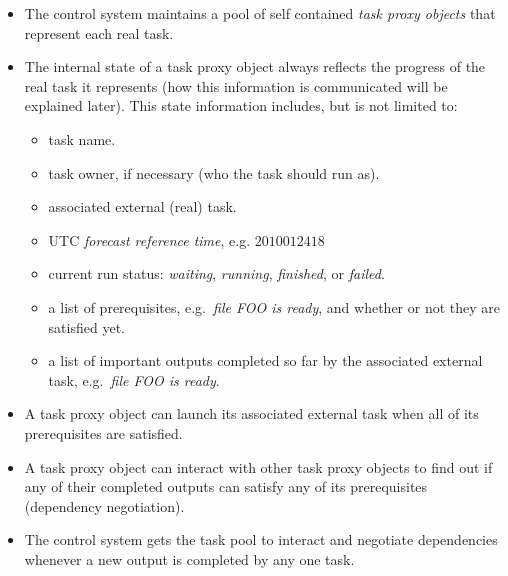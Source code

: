 \documentclass[11pt,a4paper]{article}
\begin{document}
\begin{itemize}

    \item The control system maintains a pool of self contained {\em
        task proxy objects} that represent each real task. 
       
    \item The internal state of a task proxy object always reflects the
        progress of the real task it represents (how this information is
        communicated will be explained later). This state information
        includes, but is not limited to:

        \begin{itemize}

            \item task name.

            \item task owner, if necessary (who the task should run as).

            \item associated external (real) task.  

            \item UTC {\em forecast reference time}, e.g. $2010012418$
        
            \item current run status: {\em waiting}, {\em running}, 
                {\em finished}, or {\em failed}. 

            \item a list of prerequisites, e.g.\ {\em file FOO is
                ready}, and whether or not they are satisfied yet.

            \item a list of important outputs completed so far by the
                associated external task, e.g.\ {\em file FOO is ready}.

        \end{itemize}
       
    \item A task proxy object can launch its associated external task
        when all of its prerequisites are satisfied.

    \item A task proxy object can interact with other task proxy
        objects to find out if any of their completed outputs can
        satisfy any of its prerequisites (dependency negotiation). 

    \item The control system gets the task pool to interact and
        negotiate dependencies whenever a new output is completed by any
        one task.
 
\end{itemize}
\end{document}
